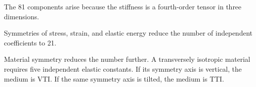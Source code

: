 \documentclass[11pt]{article}
\begin{document}
\begin{tcolorbox}[title=Key idea for students]
The 81 components arise because the stiffness is a fourth-order tensor in three dimensions.

Symmetries of stress, strain, and elastic energy reduce the number of independent coefficients to 21.

Material symmetry reduces the number further. A transversely isotropic material requires five independent elastic constants. If its symmetry axis is vertical, the medium is VTI. If the same symmetry axis is tilted, the medium is TTI.
\end{tcolorbox}
\end{document}
